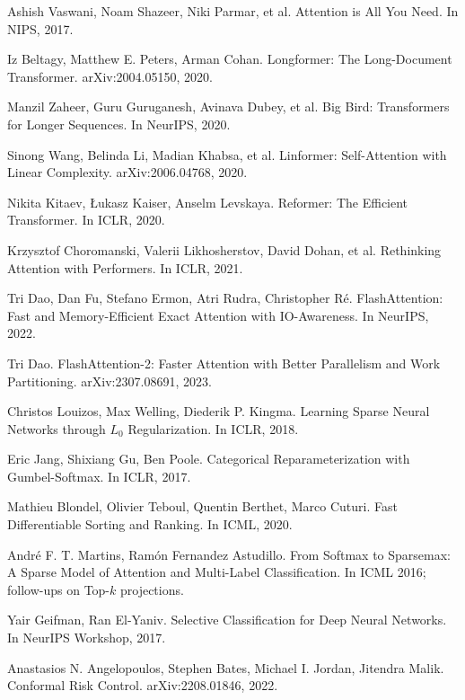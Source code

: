 \documentclass[11pt]{article}
\begin{document}
\begin{thebibliography}{99}

Ashish Vaswani, Noam Shazeer, Niki Parmar, et al. Attention is All You Need. In NIPS, 2017.

Iz Beltagy, Matthew E. Peters, Arman Cohan. Longformer: The Long-Document Transformer. arXiv:2004.05150, 2020.

Manzil Zaheer, Guru Guruganesh, Avinava Dubey, et al. Big Bird: Transformers for Longer Sequences. In NeurIPS, 2020.

Sinong Wang, Belinda Li, Madian Khabsa, et al. Linformer: Self-Attention with Linear Complexity. arXiv:2006.04768, 2020.

Nikita Kitaev, Łukasz Kaiser, Anselm Levskaya. Reformer: The Efficient Transformer. In ICLR, 2020.

Krzysztof Choromanski, Valerii Likhosherstov, David Dohan, et al. Rethinking Attention with Performers. In ICLR, 2021.

Tri Dao, Dan Fu, Stefano Ermon, Atri Rudra, Christopher Ré. FlashAttention: Fast and Memory-Efficient Exact Attention with IO-Awareness. In NeurIPS, 2022.

Tri Dao. FlashAttention-2: Faster Attention with Better Parallelism and Work Partitioning. arXiv:2307.08691, 2023.

Christos Louizos, Max Welling, Diederik P. Kingma. Learning Sparse Neural Networks through $L_0$ Regularization. In ICLR, 2018.

Eric Jang, Shixiang Gu, Ben Poole. Categorical Reparameterization with Gumbel-Softmax. In ICLR, 2017.

Mathieu Blondel, Olivier Teboul, Quentin Berthet, Marco Cuturi. Fast Differentiable Sorting and Ranking. In ICML, 2020.

André F. T. Martins, Ramón Fernandez Astudillo. From Softmax to Sparsemax: A Sparse Model of Attention and Multi-Label Classification. In ICML 2016; follow-ups on Top-$k$ projections.

Yair Geifman, Ran El-Yaniv. Selective Classification for Deep Neural Networks. In NeurIPS Workshop, 2017.

Anastasios N. Angelopoulos, Stephen Bates, Michael I. Jordan, Jitendra Malik. Conformal Risk Control. arXiv:2208.01846, 2022.


\end{thebibliography}
\end{document}

